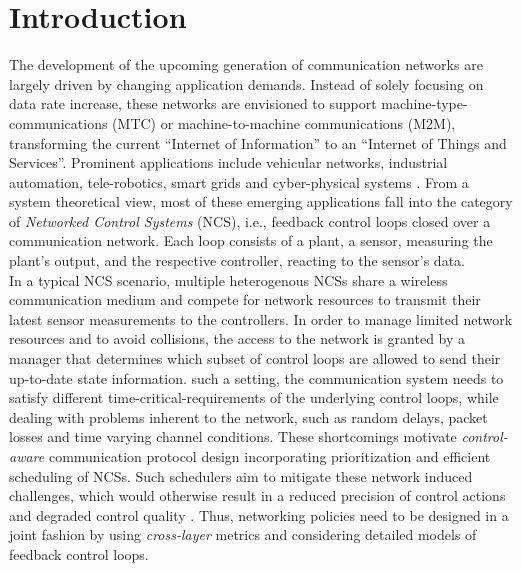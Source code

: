 \chapter{Introduction}


The development of the upcoming generation of communication networks are largely
driven by changing application demands. Instead of solely focusing on data rate
increase, these networks are envisioned to support machine-type-communications
(MTC) or machine-to-machine communications (M2M), transforming the current
``Internet of Information'' to an ``Internet of Things and Services''. Prominent
applications include vehicular networks, industrial automation, tele-robotics,
smart grids and cyber-physical systems \cite{murray2003future}. From a system
theoretical view, most of these emerging applications fall into the category of
\textit{Networked Control Systems} (NCS), i.e., feedback control loops closed
over a communication network. Each loop consists of a plant, a sensor, measuring
the plant’s output, and the respective controller, reacting to the sensor’s
data. \\
In a typical NCS scenario, multiple heterogenous NCSs share a wireless
communication medium and compete for network resources to transmit their latest
sensor measurements to the controllers. In order to manage limited network
resources and to avoid collisions, the access to the network is granted by a
manager that determines which subset of control loops are allowed to send their
up-to-date state information. such a setting, the communication system needs to
satisfy different time-critical-requirements of the underlying control loops,
while dealing with problems inherent to the network, such as random delays,
packet losses and time varying channel conditions. These shortcomings motivate
\textit{control-aware} communication protocol design incorporating
prioritization and efficient scheduling of NCSs. Such schedulers aim to mitigate
these network induced challenges, which would otherwise result in a reduced
precision of control actions and degraded control quality
\cite{vasconcelos2017optimal}. Thus, networking policies need to be designed in
a joint fashion by using \textit{cross-layer} metrics and considering detailed
models of feedback control loops. 


